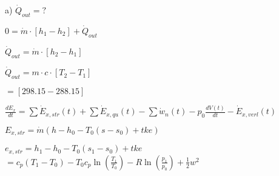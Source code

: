 a) \( \dot{Q}_{out} = ? \)  

\( 0 = \dot{m} \cdot [h_1 - h_2] + \dot{Q}_{out} \)  

\( \dot{Q}_{out} = \dot{m} \cdot [h_2 - h_1] \)  

\( \dot{Q}_{out} = m \cdot c \cdot [T_2 - T_1] \)  

\( = [298.15 - 288.15] \)

\( \frac{dE_x}{dt} = \sum \dot{E}_{x,str}(t) + \sum \dot{E}_{x,qu}(t) - \sum \dot{w}_n(t) - p_0 \frac{dV(t)}{dt} - \dot{E}_{x,verl}(t) \)  

\( E_{x,str} = \dot{m} (h - h_0 - T_0 (s - s_0) + tke) \)  

\( e_{x,str} = h_1 - h_0 - T_0 (s_1 - s_0) + tke \)  
\( = c_p (T_1 - T_0) - T_0 c_p \ln \left( \frac{T_1}{T_0} \right) - R \ln \left( \frac{p_1}{p_0} \right) + \frac{1}{2} w^2 \)